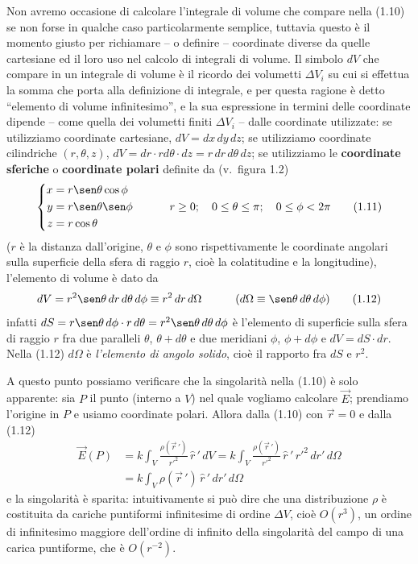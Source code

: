 Non avremo occasione di calcolare l'integrale di volume che compare nella (1.10) se non forse in qualche caso particolarmente semplice, tuttavia questo è il momento giusto per richiamare -- o definire -- coordinate diverse da quelle cartesiane ed il loro uso nel calcolo di integrali di volume. Il simbolo $dV$ che compare in un integrale di volume è il ricordo dei volumetti $\Delta V_i$ su cui si effettua la somma che porta alla definizione di integrale, e per questa ragione è detto ``elemento di volume infinitesimo'', e la sua espressione in termini delle coordinate dipende -- come quella dei volumetti finiti $\Delta V_i$ -- dalle coordinate utilizzate: se utilizziamo coordinate cartesiane, $dV=dx\,dy\,dz$; se utilizziamo coordinate cilindriche $(r,\theta,z)$, $dV=dr\cdot r d\theta\cdot dz=r\,dr\,d\theta\,dz$; se utilizziamo le \textbf{coordinate sferiche} o \textbf{coordinate polari} definite da (v.\ figura 1.2)
\begin{equation}
\left\{\begin{aligned}
x&=r\sen\theta\cos\phi\\
y&=r\sen\theta\sen\phi\\
z&=r\cos\theta
\end{aligned}\right.
\qquad\quad r\ge0;\quad 0\le\theta\le\pi;\quad 0\le\phi<2\pi
\tag{1.11}
\end{equation}
($r$ è la distanza dall'origine, $\theta$ e $\phi$ sono rispettivamente le coordinate angolari sulla superficie della sfera di raggio $r$, cioè la colatitudine e la longitudine), l'elemento di volume è dato da
\begin{equation}
dV=r^2\sen\theta\,dr\,d\theta\,d\phi\equiv r^2\,dr\,d\Omega\qquad\quad(d\Omega\equiv\sen\theta\,d\theta\,d\phi)
\tag{1.12}
\end{equation}
infatti $dS=r\sen\theta\,d\phi\cdot r\,d\theta=r^2\sen\theta\,d\theta\,d\phi$ è l'elemento di superficie sulla sfera di raggio $r$ fra due paralleli $\theta$, $\theta+d\theta$ e due meridiani $\phi$, $\phi+d\phi$ e $dV=dS\cdot dr$. Nella (1.12) $d\Omega$ è \emph{l'elemento di angolo solido}, cioè il rapporto fra $dS$ e $r^2$.

A questo punto possiamo verificare che la singolarità nella (1.10) è solo apparente: sia $P$ il punto (interno a $V$) nel quale vogliamo calcolare $\vec E$; prendiamo l'origine in $P$ e usiamo coordinate polari. Allora dalla (1.10) con $\vec r=0$ e dalla (1.12)
\begin{equation}
\begin{split}
\vec E(P)&=k\int_V\frac{\rho(\vec r\,')}{r'^2}\,\hat r\,'\,dV=k\int_V\frac{\rho(\vec r\,')}{r'^2}\,\hat r\,'\,r'^2\,dr'\,d\Omega\\
&=k\int_V\rho(\vec r\,')\,\hat r\,'\,dr'\,d\Omega
\end{split}
\tag{1.13}
\end{equation}
e la singolarità è sparita: intuitivamente si può dire che una distribuzione $\rho$ è costituita da cariche puntiformi infinitesime di ordine $\Delta V$, cioè $O(r^3)$, un ordine di infinitesimo maggiore dell'ordine di infinito della singolarità del campo di una carica puntiforme, che è $O(r^{-2})$.

